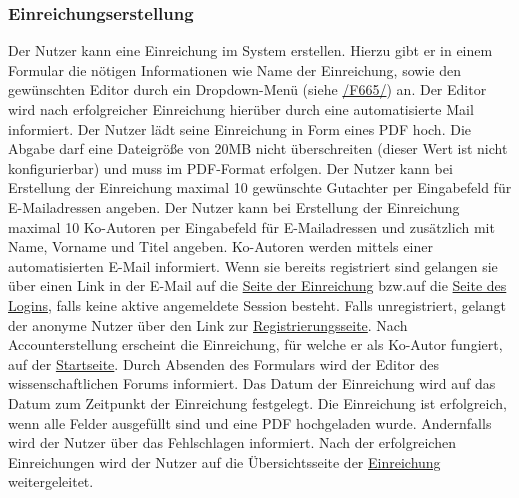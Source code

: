 \subsubsection{Einreichungserstellung}\label{nut:eein}
\begin{description}
     Der Nutzer kann eine Einreichung im System erstellen. Hierzu gibt er in einem
    Formular die nötigen Informationen wie Name der Einreichung, sowie den gewünschten Editor durch ein Dropdown-Menü
    (siehe \hyperref[funkt:665]{/F665/})
    an.
    Der Editor wird nach erfolgreicher Einreichung hierüber durch eine automatisierte Mail informiert.
     Der Nutzer lädt seine Einreichung in Form eines PDF hoch. Die Abgabe darf eine Dateigröße
    von 20MB nicht überschreiten (dieser Wert ist nicht konfigurierbar) und muss im PDF-Format erfolgen.
     Der Nutzer kann bei Erstellung der Einreichung maximal 10 gewünschte Gutachter per
    Eingabefeld für E-Mailadressen angeben.
     Der Nutzer kann bei Erstellung der Einreichung maximal 10 Ko-Autoren per
    Eingabefeld für E-Mailadressen und zusätzlich mit Name, Vorname und Titel angeben.
     Ko-Autoren werden mittels einer automatisierten E-Mail informiert. Wenn sie bereits
    registriert sind gelangen sie über einen Link in der E-Mail auf die \hyperref[nut:ein]{Seite der Einreichung} bzw.auf die \hyperref[an:log]{Seite des Logins},
    falls keine aktive angemeldete Session besteht.
    Falls unregistriert, gelangt der anonyme Nutzer über den Link zur \hyperref[an:reg]{Registrierungsseite}.
    Nach Accounterstellung erscheint die Einreichung, für welche er als Ko-Autor fungiert, auf der \hyperref[nut:start]{Startseite}.
     Durch Absenden des Formulars wird der Editor des wissenschaftlichen Forums
    informiert. Das Datum der Einreichung wird auf das Datum zum Zeitpunkt der Einreichung festgelegt.
     Die Einreichung ist erfolgreich, wenn alle Felder ausgefüllt sind und eine PDF
    hochgeladen wurde. Andernfalls wird der Nutzer über das Fehlschlagen informiert.
     Nach der erfolgreichen Einreichungen wird der Nutzer auf die Übersichtsseite der
    \hyperref[nut:ein]{Einreichung} weitergeleitet.
\end{description}

